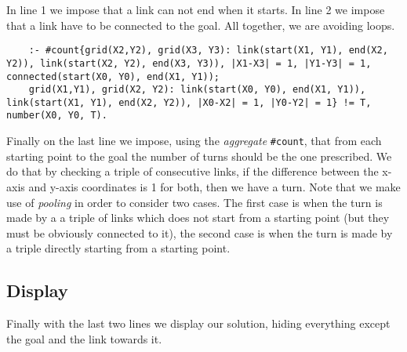 In line 1 we  impose that a link can not end when it starts. In line 2 we impose that a link have to be connected to the goal. All together, we are avoiding loops.

\begin{verbatim}
    :- #count{grid(X2,Y2), grid(X3, Y3): link(start(X1, Y1), end(X2, Y2)), link(start(X2, Y2), end(X3, Y3)), |X1-X3| = 1, |Y1-Y3| = 1, connected(start(X0, Y0), end(X1, Y1));
    grid(X1,Y1), grid(X2, Y2): link(start(X0, Y0), end(X1, Y1)), link(start(X1, Y1), end(X2, Y2)), |X0-X2| = 1, |Y0-Y2| = 1} != T, number(X0, Y0, T).
\end{verbatim}

Finally on the last line we impose, using the \emph{aggregate} \texttt{#count}, that from each starting point to the goal the number of turns should be the one prescribed. We do that by checking a triple of consecutive links, if the difference between the x-axis and y-axis coordinates is 1 for both, then we have a turn.
 Note that we make use of \emph{pooling} in order to consider two cases. The first case is when the turn is made by a a triple of links which does not start from a starting point (but they must be obviously connected to it), the second case is when the turn is made by a triple directly starting from a starting point.

\subsection{Display}

Finally with the last two lines we display our solution, hiding everything except the goal and the link towards it.